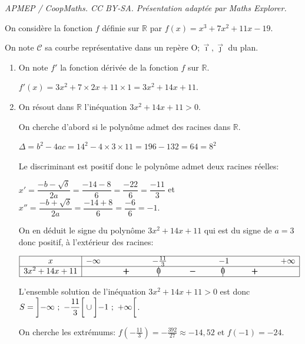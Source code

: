 \documentclass[10pt]{article}
\providecommand{\R}{\mathbb{R}}
\providecommand{\Oij}{\(\mathrm{O};\vec{\imath},\vec{\jmath}\)}
\begin{document}
\noindent\textit{APMEP / CoopMaths. CC BY-SA. Présentation adaptée par Maths Explorer.}\par\medskip
\bigskip

On considère la fonction $f$ définie sur $\R$ par $f(x)=x^3 + 7x^2 +11x - 19$.

On note $\mathcal{C}$ sa courbe représentative dans un repère \Oij{} du plan.

\begin{enumerate}
\item On note $f'$ la fonction dérivée de la fonction $f$ sur $\R$. 

$f'(x) = 3x^2 +7\times 2x +11\times 1 = 3x^2+14x+11$.

\item On résout dans $\R$ l'inéquation $3x^2+14x+11 > 0$.

On cherche d'abord si le polynôme admet des racines dans $\R$.

$\Delta = b^2-4ac = 14^2 - 4\times 3 \times 11 = 196-132=64=8^2$

Le discriminant est positif donc le polynôme admet deux racines réelles:

$x'=\dfrac{-b-\sqrt{\delta}}{2a} = \dfrac{-14-8}{6} = \dfrac{-22}{6}=\dfrac{-11}{3}$
et
$x''=\dfrac{-b+\sqrt{\delta}}{2a} = \dfrac{-14+8}{6} = \dfrac{-6}{6}=-1$.

On en déduit le signe du polynôme $3x^2+14x+11$ qui est du signe de $a=3$ donc positif, à l'extérieur des racines:

\begin{center}
{
\renewcommand{\arraystretch}{1.5}
\def\esp{\hspace*{1.5cm}}
$\begin{array}{|c | *{7}{c} |} 
\hline
x  & -\infty & \esp & -\frac{11}{3} & \esp & -1 & \esp & +\infty \\
\hline
3x^2+14x+11 &  & \pmb{+} &  \vline\hspace{-2.7pt}{0} & \pmb{-} & \vline\hspace{-2.7pt}{0} & \pmb{+} &\\
\hline
\end{array}$
}
\end{center}

L'ensemble solution de l'inéquation $3x^2+14x+11 > 0$ est donc $S=\left ]-\infty~;~-\dfrac{11}{3} \right [ \cup \left ] -1~;~+\infty\vphantom{\dfrac{11}{3}} \right [$.

On cherche les extrémums:
$f\left ( -\frac{11}{3}\right )=-\frac{392}{27}\approx -14,52$ et $f(-1) = -24$.


\end{enumerate}
\end{document}
